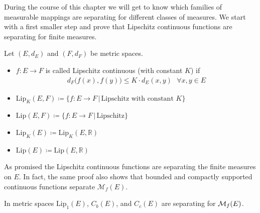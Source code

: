  During the course of this chapter we will get to know which families of measurable mappings are separating for different classes of measures. We start with a first smaller step and prove that Lipschitz continuous functions are separating for finite measures.
\begin{ldef}
\begin{deff}
	Let $(E,d_E)$ and $(F,d_F)$ be metric spaces.
	\begin{itemize}
		\item
			$f\colon E \to F$ is called Lipschitz continuous (with constant $K$) if 
			\begin{align*}
				d_F \big( f(x),f(y) \big) \leq K \cdot d_E(x,y) \:\:\: \forall x,y\in E
			\end{align*}
		\item
			$\text{Lip}_K(E,F) \coloneqq \{ f\colon E\to F \,|\, \text{Lipschitz with constant }K \}$
		\item
			$\text{Lip}(E,F) \coloneqq \{ f\colon E\to F \,|\, \text{Lipschitz}\}$
		\item
			$\text{Lip}_K(E) \coloneqq \text{Lip}_K(E,\mathbb{R})$
		\item $\text{Lip}(E) \coloneqq \text{Lip}(E,\mathbb{R})$
	\end{itemize}
\end{deff}
\end{ldef}
As promised the Lipschitz continuous functions are separating the finite measures on $E$. In fact, the same proof also shows that bounded and compactly supported continuous functions separate $\mathcal M_f(E)$. 
\begin{lsatzwichtig}
\begin{prop}\label{theorem_4124}
	In metric spaces $\text{Lip}_1(E)$, $C_b(E)$, and $C_c(E)$ are separating for $\mathcal{M}_f(E)$.
\end{prop}
\end{lsatzwichtig}
